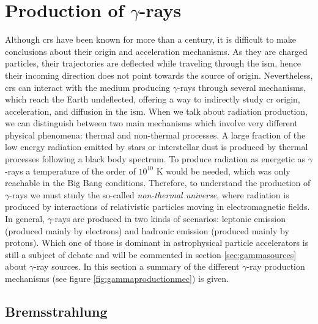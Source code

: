 \documentclass[main.tex]{subfiles}
\begin{document}
\section{Production of $\gamma$-rays}\label{sec:gammaproduction}

Although \glspl{cr} have been known for more than a century, it is difficult to make conclusions about their origin and acceleration mechanisms. As they are charged particles, their trajectories are deflected while traveling through the \gls{ism}, hence their incoming direction does not point towards the source of origin. Nevertheless, \glspl{cr} can interact with the medium producing $\gamma$-rays through several mechanisms, which reach the Earth undeflected, offering a way to indirectly study \gls{cr} origin, acceleration, and diffusion in the \gls{ism}.  
When we talk about radiation production, we can distinguish between two main mechanisms which involve very different physical phenomena: thermal and non-thermal processes. A large fraction of the low energy radiation emitted by stars or interstellar dust is produced by thermal processes following a black body spectrum. To produce radiation as energetic as $\gamma$-rays a temperature of the order of $10^{10}$ K would be needed, which was only reachable in the Big Bang conditions. Therefore, to understand the production of $\gamma$-rays we must study the so-called \textit{non-thermal universe}, where radiation is produced by interactions of relativistic particles moving in electromagnetic fields.
In general, $\gamma$-rays are produced in two kinds of scenarios: leptonic emission (produced mainly by electrons) and hadronic emission (produced mainly by protons). Which one of those is dominant in astrophysical particle accelerators is still a subject of debate and will be commented in section \ref{sec:gammasources} about $\gamma$-ray sources.
In this section a summary of the different $\gamma$-ray production mechanisms (see figure \ref{fig:gammaproductionmec}) is given.

\subsection{Bremsstrahlung}
\end{document}
